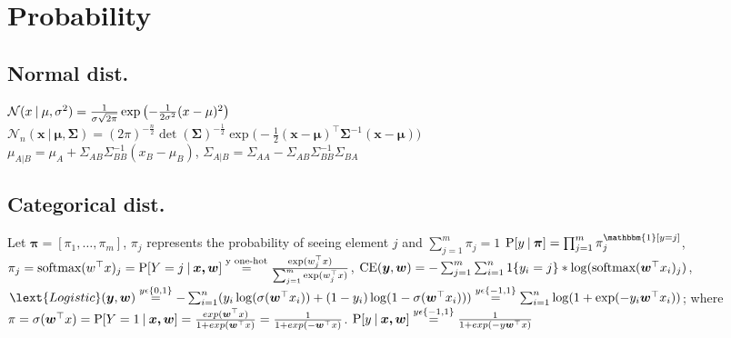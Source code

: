 \section{Probability}
\subsection{Normal dist.}
$\mathcal{N}(x\:|\: \mu, \sigma^{2}) = \frac{1}{\sigma \sqrt{2\pi}}\exp\left(-\frac{1}{2\sigma^{2}}(x - \mu)^{2}\right)$\\

$\mathcal{N}_{n}(\bm{x}\:|\: \bm{\mu}, \bm{\Sigma}) =
(2\pi)^{-\frac{n}{2}}\det(\bm{\Sigma})^{-\frac{1}{2}}\exp \big(-\frac{1}{2}(\bm{x} -
\bm{\mu})^{\top}\bm{\Sigma}^{-1}(\bm{x} - \bm{\mu}) \big)$\\
$\mu_{A|B}=\mu_A+\Sigma_{AB}\Sigma^{-1}_{BB}(x_B-\mu_B)$,
$\Sigma_{A|B}=\Sigma_{AA}-\Sigma_{AB}\Sigma^{-1}_{BB}\Sigma_{BA}$

\subsection{Categorical dist.}
Let $\bm{\pi} = [\pi_{1}, \dots, \pi_{m}]$, $\pi_{j}$ represents the probability of seeing element $j$ and
$\sum_{j=1}^{m}\pi_{j} = 1$
$\prob{y}[\bm{\pi}] = \prod_{j=1}^{m}\pi_{j}^{\mathbbm{1}[y = j]}$,
$\pi_{j}=\text{softmax}(w^{\top}x)_{j} = \prob{Y=j}[\bm{x,w}] \overset{\text{y one-hot}}{=}
\frac{\exp(w_{j}^{\top}x)}{\sum_{j=1}^{m}\exp(w_{j}^{\top}x)}$,
$\text{CE} (\bm{y},\bm{w})=-\sum_{j=1}^{m}\sum_{i=1}^{n}1\cset{y_{i}=j}* \log (\text{softmax}(\bm{w}^{\top}x_{i})_{j})$,
$\lext{Logistic} (\bm{y},\bm{w}) \overset{y\epsilon\{0,1\}}{=} -\sum_{i=1}^{n}(y_{i}\log(
\sigma(\bm{w}^{\top}x_{i}))+(1-y_{i})\log(1-\sigma(\bm{w}^{\top}x_{i})))
\overset{y\epsilon\{-1,1\}}{=}\sum_{i=1}^{n}\log(1+\exp(-y_{i}\bm{w}^{\top}x_{i}))$;
where
$\pi = \sigma(\bm{w}^{\top}x) = \prob{Y=1}[\bm{x,w}] = \frac{exp(\bm{w}^{\top}x)}{1 + exp(\bm{w}^{\top}x)} =
\frac{1}{1 + exp(-\bm{w}^{\top}x)}$. $\prob{y}[\bm{x,w}] \overset{y\epsilon\{-1,1\}}{=}
\frac{1}{1 + exp(-y\bm{w}^{\top}x)}$ \\

